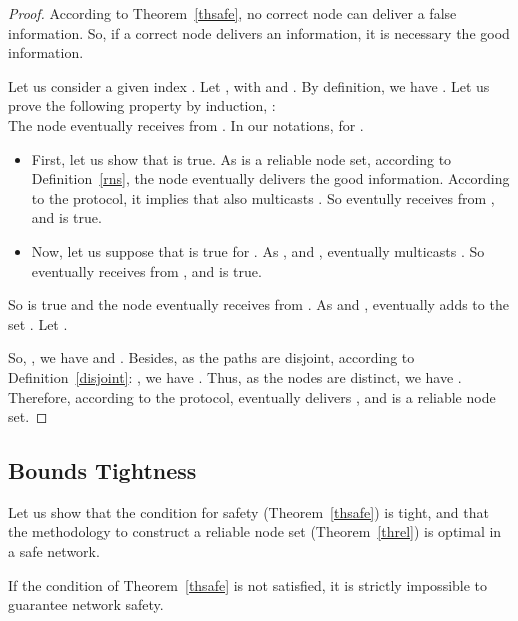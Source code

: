 \documentclass[a4paper,11pt]{article}
\begin{document}
\begin{proof}
According to Theorem~\ref{thsafe}, no correct node can deliver a false information. So, if a correct node delivers an information, it is necessary the good information.

Let us consider a given index .
Let , with  and . By definition, we have .
Let us prove the following property  by induction, :
\\The node  eventually receives  from . In our notations,  for .

\begin{itemize}

\item First, let us show that  is true.
As  is a reliable node set, according to Definition~\ref{rns}, the node  eventually delivers the good information.
According to the protocol, it implies that  also multicasts .
So  eventully receives  from , and  is true.

\item Now, let us suppose that  is true for .
As , and ,  eventually multicasts .
So  eventually receives  from , and  is true.

\end{itemize}

So  is true and the node  eventually receives  from .
As  and ,  eventually adds  to the set .
Let .

So, , we have  and .
Besides, as the paths  are disjoint, according to Definition~\ref{disjoint}: , we have .
Thus, as the nodes  are distinct, we have .
Therefore, according to the protocol,  eventually delivers , and  is a reliable node set.

\end{proof}



\subsection{Bounds Tightness}
\label{tight}

Let us show that the condition for safety (Theorem~\ref{thsafe}) is tight, and that the methodology to construct a reliable node set (Theorem~\ref{threl}) is optimal in a safe network.

\begin{theorem}
If the condition of Theorem~\ref{thsafe} is not satisfied, it is strictly impossible to guarantee network safety.
\end{theorem}
\end{document}
